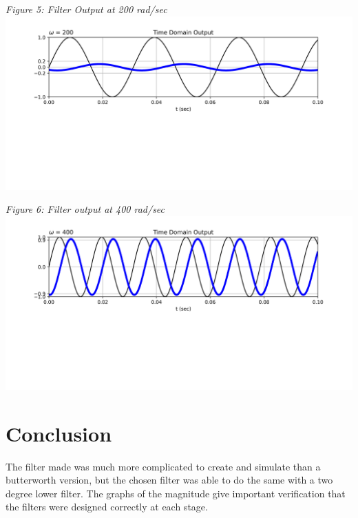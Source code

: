 \documentclass[12pt,a4paper]{article}
\begin{document}
		\begin{center}
		\textit{Figure 5: Filter Output at 200 rad/sec }
		\includegraphics[width = 7in]{Figure_5.png} \vspace*{12pt}
		
		\textit{Figure 6: Filter output at 400 rad/sec}
		\includegraphics[width = 7in]{Figure_6.png} 
	\end{center}
	\section*{Conclusion}
	The filter made was much more complicated to create and simulate than a butterworth version, but the chosen filter was able to do the same with a two degree lower filter. The graphs of the magnitude give important verification that the filters were designed correctly at each stage. 
	
\end{document}
